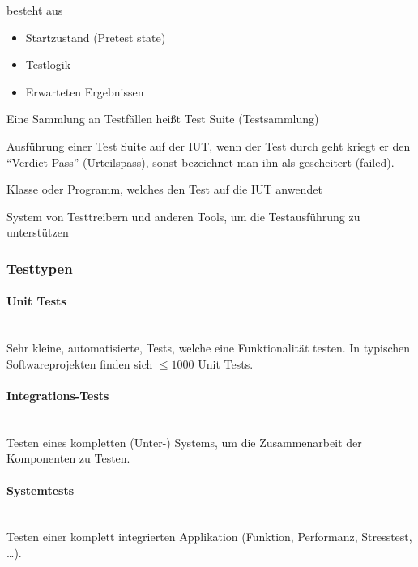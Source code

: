 \documentclass[
    ngerman,
    color=3b,
    summary,
    boxarc,
    main,
]{rubos-tuda-template}
\begin{document}
\begin{definition}
    besteht aus\begin{itemize}
        \item Startzustand (Pretest state)
        \item Testlogik
        \item Erwarteten Ergebnissen
    \end{itemize}
\end{definition}
\begin{definition}
    Eine Sammlung an Testfällen heißt Test Suite (Testsammlung)
\end{definition}
\begin{definition}
    Ausführung einer Test Suite auf der IUT, wenn der Test durch geht kriegt er den \enquote{Verdict Pass} (Urteilspass), sonst bezeichnet man ihn als gescheitert (failed).
\end{definition}
\begin{definition}
    Klasse oder Programm, welches den Test auf die IUT anwendet
\end{definition}
\begin{definition}
    System von Testtreibern und anderen Tools, um die Testausführung zu unterstützen
\end{definition}

\subsubsection{Testtypen}
\paragraph{Unit Tests}\mbox{}\\
Sehr kleine, automatisierte, Tests, welche eine Funktionalität testen. In typischen Softwareprojekten finden sich $ \leq 1000 $ Unit Tests.

\paragraph{Integrations-Tests}\mbox{}\\
Testen eines kompletten (Unter-) Systems, um die Zusammenarbeit der Komponenten zu Testen.

\paragraph{Systemtests}\mbox{}\\
Testen einer komplett integrierten Applikation (Funktion, Performanz, Stresstest, \dots).
\clearpage
\end{document}
